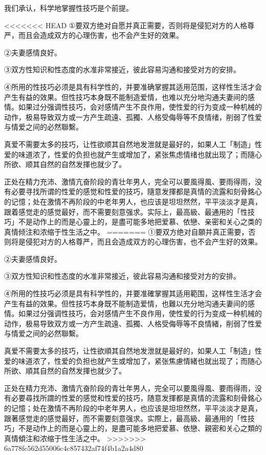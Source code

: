 \documentclass[12pt,UTF8]{ctexbook}
\begin{document}
我们承认，科学地掌握性技巧是个前提。

<<<<<<< HEAD
①要双方绝对自愿并真正需要，否则将是侵犯对方的人格尊严，而且会造成双方的心理伤害，也不会产生好的效果。

②夫妻感情良好。

③双方性知识和性态度的水准非常接近，彼此容易沟通和接受对方的安排。

④所用的性技巧必须是具有科学性的，并要准确掌握其适用范围，这样性生活才会产生有益的效果。但性技巧本身既不能制造爱情，也难以充分地沟通夫妻间的感情。如果过分强调性技巧，会对感情产生不良作用，使性爱的行为变成一种机械的动作，极易导致双方或一方产生疏遠、孤獨、人格受侮辱等不良情绪，削弱了性爱与情爱之间的必然聯繫。

真爱不需要太多的技巧，让性欲顺其自然地发泄就是最好的，如果人工「制造」性爱的味道浓了，性爱的负担也就产生或增加了，紧张焦虑情绪也就出现了；而隨心所欲、顺其自然的自然发揮也就少了。

正处在精力充沛、激情亢奋阶段的青壮年男人，完全可以要風得風、要雨得雨，没有必要寻找所谓的性爱的感觉和性爱的技巧，隨意发揮都是真情的流露和刻骨銘心的记憶；处在激情不再阶段的中老年男人，也应该是坦坦然然，平平淡淡才是真，跟着感觉走的感觉最好，而不需要刻意强求。实际上，最高級、最通用的「性技巧」不是动作上的而是心靈上的，是盡可能多地把爱慕、依戀、亲密和关心之类的真情倾注和浓缩于性生活之中。
=======
①要双方绝对自願并真正需要，否则将是侵犯对方的人格尊严，而且会造成双方的心理伤害，也不会产生好的效果。

②夫妻感情良好。

③双方性知识和性态度的水准非常接近，彼此容易沟通和接受对方的安排。

④所用的性技巧必须是具有科学性的，并要准確掌握其适用範围，这样性生活才会产生有益的效果。但性技巧本身既不能制造爱情，也難以充分地沟通夫妻间的感情。如果过分强调性技巧，会对感情产生不良作用，使性爱的行为变成一种机械的动作，极易导致双方或一方产生疏遠、孤獨、人格受侮辱等不良情緒，削弱了性爱与情爱之间的必然聯繫。

真爱不需要太多的技巧，让性欲順其自然地发泄就是最好的，如果人工「制造」性爱的味道浓了，性爱的负担也就产生或增加了，紧张焦慮情緒也就出现了；而随心所欲、順其自然的自然发揮也就少了。

正处在精力充沛、激情亢奋阶段的青壮年男人，完全可以要風得風、要雨得雨，没有必要尋找所謂的性爱的感觉和性爱的技巧，随意发揮都是真情的流露和刻骨銘心的记憶；处在激情不再阶段的中老年男人，也应该是坦坦然然，平平淡淡才是真，跟著感觉走的感觉最好，而不需要刻意强求。实際上，最高級、最通用的「性技巧」不是动作上的而是心靈上的，是盡可能多地把爱慕、依戀、親密和关心之類的真情傾注和浓缩于性生活之中。
>>>>>>> 6a778fc562d55006c4c857432af74f4b1a2a4d80
\end{document}

